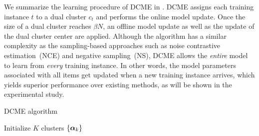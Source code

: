 We summarize the learning procedure of DCME in . DCME assigns
each training instance $t$ to a dual cluster $c_t$ and performs the online model
update. Once the size of a dual cluster reaches $\beta N$, an offline model
update as well as the update of the dual cluster center are applied.  Although
the algorithm has a similar complexity as the sampling-based approaches such as
noise contrastive estimation~(NCE) and negative sampling~(NS), DCME allows the
\emph{entire} model to learn from \emph{every} training instance. In other
words, the model parameters associated with all items get updated when a new
training instance arrives, which yields superior performance over existing
methods, as will be shown in the experimental study.

\begin{algorithm}[h]
\caption{DCME algorithm}\label{alg::dcme}
  Initialize $K$ clusters $\{\boldsymbol{\alpha}_k\}$ \;
\end{algorithm}


